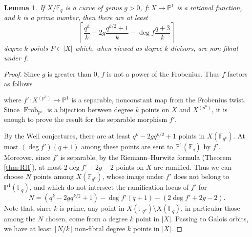 \documentclass[10pt,a4paper]{amsart}
\newtheorem{lemma}{Lemma}
\newcommand{\F}{\mathbb{F}}
\DeclareMathOperator{\Frob}{Frob}
\newcommand{\PP}{\mathbb{P}}
\begin{document}
\begin{lemma}\label{lem:non-fibralcount}
    If $X/\F_q$ is a curve of genus $g>0$, $f: X \to \PP^1$ is a rational function, and $k$ is a prime number, then there are at least 
    \[\left\lceil\frac{q^k}{k} - 2g\frac{q^{k/2}+1}{k} - \deg f \frac{q+3}{k}\right\rceil\] 
    degree $k$ points $P \in |X|$ which, when viewed as degree $k$ divisors, are non-fibral under $f$. 
\end{lemma}

\begin{proof}
    Since $g$ is greater than $0$, $f$ is not a power of the Frobenius. Thus $f$ factors as follows
    \begin{center}
    \end{center}
    where $f':X^{(p^n)} \to \PP^1$ is a separable, nonconstant map from the Frobenius twist. Since $\Frob_{p^n}$ is a bijection between degree $k$ points on $X$ and $X^{(p^n)}$, it is enough to prove the result for the separable morphism $f'$.

    By the Weil conjectures, there are at least $q^k-2gq^{k/2}+1$ points in $X(\F_{q^k})$. At most $(\deg f') (q+1)$ among these points are sent to $\PP^1(\F_q)$ by $f'$. Moreover, since $f'$ is separable, by the Riemann--Hurwitz formula (Theorem \ref{thm:RH}), at most $2\deg f' + 2g -2$ points on $X$ are ramified. Thus we can choose $N$ points among $X(\F_{q^k})$, whose image under $f'$ does not belong to $\PP^1(\F_q)$, and which do not intersect the ramification locus of $f'$ for \[N=(q^k-2gq^{k/2}+1) - \deg f' (q+1) - (2\deg f' + 2g - 2).\]
    Note that, since $k$ is prime, any point in $X(\F_{q^k})\setminus X(\F_q)$, in particular those among the $N$ chosen, come from a degree $k$ point in $|X|$. Passing to Galois orbits, we have at least $\lceil N/k \rceil$ non-fibral degree $k$ points in $|X|$.
\end{proof}
\end{document}
